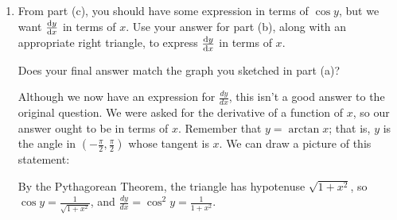 \documentclass[main]{subfiles}
\begin{document}
\begin{enumerate}
\begin{enumerate}[resume]
    \begin{solution}
      We differentiate both sides of the equation $\tan y = x$ with
      respect to $x$: 
      \begin{align*}
        \frac{d}{dx} (\tan y) &= \frac{d}{dx} (x) \\
        \sec^2 y \cdot \frac{dy}{dx} &= 1 \\
        \frac{dy}{dx} &= \cos^2 y 
      \end{align*}
    \end{solution}


    \item 
    \begin{problem}[\vfill\newpage]
        From part (c), you should have some expression in terms
      of $\cos y$, but we want $\diff yx$ in terms of $x$. Use your answer for part (b), along with an appropriate right triangle, 
      to express $\diff yx$ in terms of $x$.

      Does your final answer match the graph you sketched in part (a)?
    \end{problem}

    \begin{solution}
        Although we now have an expression for $\frac{dy}{dx}$, this isn't a
      good answer to the original question.  We were asked for the
      derivative of a function of $x$, so our answer ought to be in terms
      of $x$.  Remember that $y = \arctan x$; that is, $y$ is the angle in
      $\left( - \frac{\pi}{2}, \frac{\pi}{2} \right)$ whose tangent is
      $x$.  We can draw a picture of this statement:
      \begin{center}
      \end{center}
      By the Pythagorean Theorem, the triangle has hypotenuse $\sqrt{1 +
        x^2}$, so $\cos y = \frac{1}{\sqrt{1 + x^2}}$, and $\displaystyle
      \frac{dy}{dx} = \cos^2 y = \boxed{\frac{1}{1 + x^2}}$.
    \end{solution}


\end{enumerate}
\end{enumerate}
\end{document}
